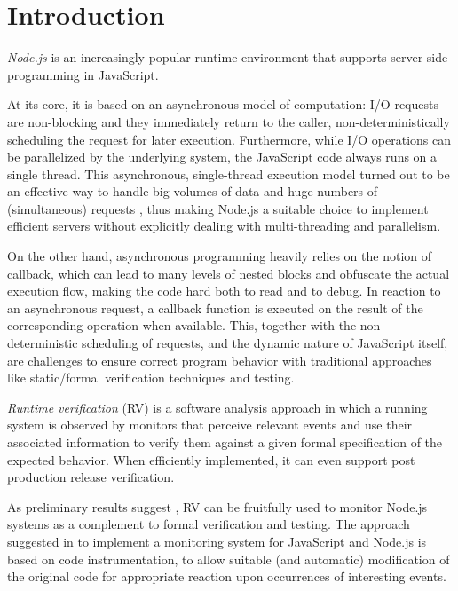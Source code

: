 \section{Introduction}
\emph{Node.js} is an increasingly popular runtime environment that supports server-side programming in JavaScript.

At its core, it is based on an asynchronous model of computation: I/O requests are non-blocking and they immediately return to the caller, non-deterministically scheduling the request for later execution.
Furthermore, while I/O operations can be parallelized by the underlying system, the JavaScript code always runs on a single thread.
This asynchronous, single-thread execution model turned out to be an effective way to handle big volumes of data and huge numbers of (simultaneous) requests \cite{Nodejs10,NodejsPerformance14}, thus making Node.js a suitable choice to implement efficient servers without explicitly dealing with multi-threading and parallelism.


%

On the other hand, asynchronous programming heavily relies on the notion of callback, which can lead to many levels of nested blocks and obfuscate the actual execution flow, making the code hard both to read and to debug.
In reaction to an asynchronous request, a callback function is executed on the result of the corresponding operation when available.
This, together with the non-deterministic scheduling of requests, and the dynamic nature of JavaScript itself, are challenges to ensure correct program behavior with traditional approaches like static/formal verification techniques and testing.

\emph{Runtime verification} (RV) \cite{rv} is a software analysis approach in which a running system is observed by monitors that perceive relevant events and use their associated information to verify them against a given formal specification of the expected behavior.
When efficiently implemented, it can even support post production release verification.

As preliminary results suggest \cite{TowardsIoT17}, RV can be fruitfully used to monitor Node.js systems as a complement to formal verification and testing.
The approach suggested in \cite{TowardsIoT17} to implement a monitoring system for JavaScript and Node.js is based on code instrumentation, to allow suitable (and automatic) modification of the original code for appropriate reaction upon occurrences of interesting events.


